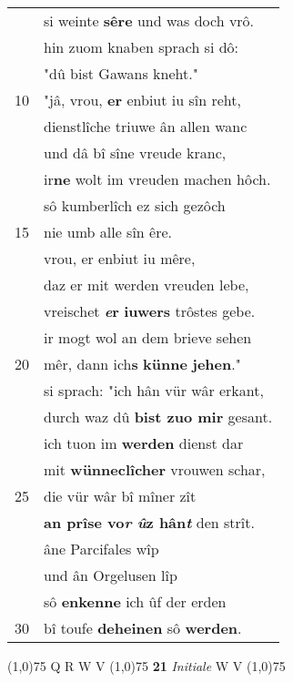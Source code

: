 \documentclass[8pt,a4paper,notitlepage]{article}
\begin{document}
\begin{table}[ht]
\begin{minipage}[t]{0.5\linewidth}
\begin{tabular}{rl}
 & si weinte \textbf{sêre} und was doch vrô.\\ 
 & hin zuom knaben sprach si dô:\\ 
 & "dû bist Gawans kneht."\\ 
10 & "jâ, vrou, \textbf{er} enbiut iu sîn reht,\\ 
 & dienstlîche triuwe ân allen wanc\\ 
 & und dâ bî sîne vreude kranc,\\ 
 & ir\textbf{ne} wolt im vreuden machen hôch.\\ 
 & sô kumberlîch ez sich gezôch\\ 
15 & nie umb alle sîn êre.\\ 
 & vrou, er enbiut iu mêre,\\ 
 & daz er mit werden vreuden lebe,\\ 
 & vreischet \textbf{\textit{e}r} \textbf{iuwers} trôstes gebe.\\ 
 & ir mogt wol an dem brieve sehen\\ 
20 & mêr, dann ich\textbf{s} \textbf{künne} \textbf{jehen}."\\ 
 & si sprach: "ich hân vür wâr erkant,\\ 
 & durch waz dû \textbf{bist zuo mir} gesant.\\ 
 & ich tuon im \textbf{werden} dienst dar\\ 
 & mit \textbf{wünneclîcher} vrouwen schar,\\ 
25 & die vür wâr bî mîner zît\\ 
 & \textbf{an prîse vo\textit{r} \textit{û}z hân\textit{t}} den strît.\\ 
 & âne Parcifales wîp\\ 
 & und ân Orgelusen lîp\\ 
 & sô \textbf{en}\textbf{kenne} ich ûf der erden\\ 
30 & bî toufe \textbf{deheinen} sô \textbf{werden}.\\ 
\end{tabular}
\scriptsize
\line(1,0){75} \newline
Q R W V \newline
\line(1,0){75} \newline
\textbf{21} \textit{Initiale} W V  \newline
\line(1,0){75} \newline

\end{minipage}
\end{table}
\end{document}
